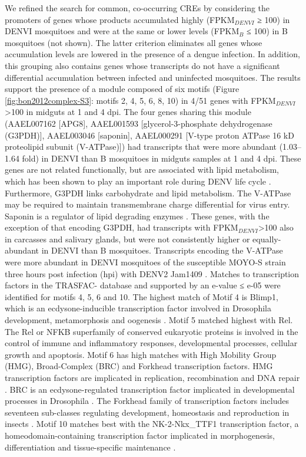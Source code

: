 We refined the search for common, co-occurring \glspl{CRE} by considering the promoters of genes whose products accumulated highly (FPKM$_{DENVI}$ ≥ 100) in \gls{DENVI} mosquitoes and were at the same or lower levels (FPKM$_{B}$ ≤ 100) in B mosquitoes (not shown).
The latter criterion eliminates all genes whose accumulation levels are lowered in the presence of a dengue infection.
In addition, this grouping also contains genes whose transcripts do not have a significant differential accumulation between infected and uninfected mosquitoes.
The results support the presence of a module composed of six motifs (Figure \ref{fig:bon2012complex-S3}: motifs 2, 4, 5, 6, 8, 10) in 4/51 genes with FPKM$_{DENVI}$>100 in midguts at 1 and 4 \gls{dpi}.
The four genes sharing this module (AAEL007162 [APG8], AAEL001593 [glycerol-3-phosphate dehydrogenase (G3PDH)], AAEL003046 [saponin], AAEL000291 [V-type proton ATPase 16 kD proteolipid subunit (V-ATPase)]) had transcripts that were more abundant (1.03–1.64 fold) in \gls{DENVI} than B mosquitoes in midguts samples at 1 and 4 \gls{dpi}.
These genes are not related functionally, but are associated with lipid metabolism, which has been shown to play an important role during \gls{DENV} life cycle \cite{Samsa2009}.
Furthermore, G3PDH links carbohydrate and lipid metabolism.
The V-ATPase may be required to maintain transmembrane charge differential for virus entry.
Saponin is a regulator of lipid degrading enzymes \cite{Lindholm2010}.
These genes, with the exception of that encoding G3PDH, had transcripts with FPKM$_{DENVI}$>100 also in carcasses and salivary glands, but were not consistently higher or equally-abundant in \gls{DENVI} than B mosquitoes.
Transcripts encoding the V-ATPase were more abundant in \gls{DENVI} mosquitoes of the susceptible MOYO-S strain three hours post infection (hpi) with \gls{DENV}2 Jam1409 \cite{Behura2011}.
Matches to transcription factors in the TRASFAC- database \cite{Matys2006} and supported by an e-value ≤ e-05 were identified for motifs 4, 5, 6 and 10.
The highest match of Motif 4 is Blimp1, which is an ecdysone-inducible transcription factor involved in Drosophila development, metamorphosis and oogenesis \cite{Agawa2007}.
Motif 5 matched highest with Rel.
The Rel or \gls{NFKB} superfamily of conserved eukaryotic proteins is involved in the control of immune and inflammatory responses, developmental processes, cellular growth and apoptosis.
Motif 6 has high matches with High Mobility Group (HMG), Broad-Complex (BRC) and Forkhead transcription factors.
HMG transcription factors are implicated in replication, recombination and DNA repair \cite{Rajeswari2002}.
BRC is an ecdysone-regulated transcription factor implicated in developmental processes in Drosophila \cite{Sandstrom1997}.
The Forkhead family of transcription factors includes seventeen sub-classes regulating development, homeostasis and reproduction in insects \cite{Hansen2007}.
Motif 10 matches best with the NK-2-Nkx\_TTF1 transcription factor, a homeodomain-containing transcription factor implicated in morphogenesis, differentiation and tissue-specific maintenance \cite{Boggaram2009}.

